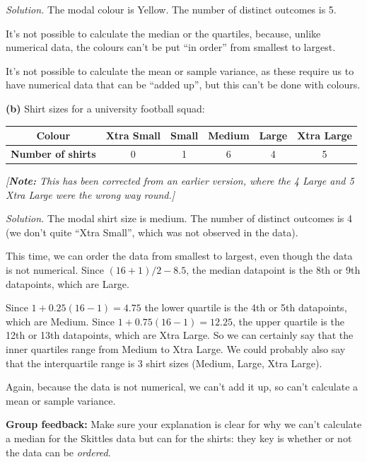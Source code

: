 \documentclass[
  a4paper,
]{book}
\theoremstyle{definition}
\theoremstyle{definition}
\theoremstyle{definition}
\theoremstyle{definition}
\theoremstyle{remark}
\begin{document}
\begin{myanswers}
\emph{Solution.}
The modal colour is Yellow. The number of distinct outcomes is 5.

It's not possible to calculate the median or the quartiles, because, unlike numerical data, the colours can't be put ``in order'' from smallest to largest.

It's not possible to calculate the mean or sample variance, as these require us to have numerical data that can be ``added up'', but this can't be done with colours.

\end{myanswers}

\textbf{(b)} Shirt sizes for a university football squad:

\begin{longtable}[]{@{}cccccc@{}}
\toprule
\textbf{Colour} & Xtra Small & Small & Medium & Large & Xtra Large \\
\midrule
\endhead
\textbf{Number of shirts} & 0 & 1 & 6 & 4 & 5 \\
\bottomrule
\end{longtable}

\emph{{[}\textbf{Note:} This has been corrected from an earlier version, where the 4 Large and 5 Xtra Large were the wrong way round.{]}}

\begin{myanswers}
\emph{Solution.}
The modal shirt size is medium. The number of distinct outcomes is 4 (we don't quite ``Xtra Small'', which was not observed in the data).

This time, we can order the data from smallest to largest, even though the data is not numerical. Since \((16 + 1)/2 - 8.5\), the median datapoint is the 8th or 9th datapoints, which are Large.

Since \(1 + 0.25(16 - 1) = 4.75\) the lower quartile is the 4th or 5th datapoints, which are Medium. Since \(1 + 0.75(16-1) = 12.25\), the upper quartile is the 12th or 13th datapoints, which are Xtra Large. So we can certainly say that the inner quartiles range from Medium to Xtra Large. We could probably also say that the interquartile range is 3 shirt sizes (Medium, Large, Xtra Large).

Again, because the data is not numerical, we can't add it up, so can't calculate a mean or sample variance.

\textbf{Group feedback:} Make sure your explanation is clear for why we can't calculate a median for the Skittles data but can for the shirts: they key is whether or not the data can be \emph{ordered}.

\end{myanswers}
\end{document}
